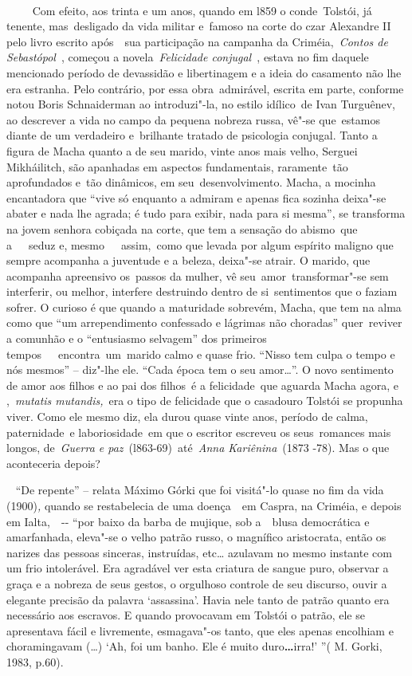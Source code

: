 ~

~~~~ Com efeito, aos trinta e um anos, quando em l859 o conde~Tolstói,
já tenente, mas~desligado da vida militar e~famoso na corte do czar
Alexandre II pelo livro escrito após~~sua participação na campanha da
Criméia,~\emph{Contos de Sebastópol}~, começou a novela~\emph{Felicidade
conjugal~}, estava no fim daquele mencionado período de devassidão e
libertinagem e a ideia do casamento não lhe era estranha. Pelo
contrário, por essa obra~admirável, escrita em parte, conforme notou
Boris Schnaiderman ao introduzi"-la, no estilo idílico~de Ivan Turguênev,
ao descrever a vida no campo da pequena nobreza russa, vê"-se que~estamos
diante de um verdadeiro e~brilhante tratado de psicologia conjugal.
Tanto a figura de Macha quanto a de seu marido, vinte anos mais velho,
Serguei Mikháilitch, são apanhadas em aspectos fundamentais,
raramente~tão aprofundados e~tão dinâmicos, em seu~desenvolvimento.
Macha, a mocinha encantadora que ``vive só enquanto a admiram e apenas
fica sozinha deixa"-se abater e nada lhe agrada; é tudo para exibir, nada
para si mesma'', se transforma na jovem senhora cobiçada na corte, que
tem a sensação do abismo~que a~~~seduz e, mesmo~~~assim,~como que levada
por algum espírito maligno que sempre acompanha a juventude e a beleza,
deixa"-se atrair. O marido, que acompanha apreensivo os~passos da mulher,
vê seu~amor~transformar"-se sem interferir, ou melhor, interfere
destruindo dentro de si~sentimentos que o faziam sofrer. O curioso é que
quando a maturidade sobrevém, Macha, que tem na alma como que ``um
arrependimento confessado e lágrimas não choradas'' quer~reviver a
comunhão e o ``entusiasmo selvagem'' dos primeiros
tempos~~~encontra~um~marido calmo e quase frio. ``Nisso tem culpa o
tempo e nós mesmos'' -- diz"-lhe ele. ``Cada época tem o seu amor\ldots{}''. O
novo sentimento de amor aos filhos e ao pai dos filhos~é a
felicidade~que aguarda Macha agora, e ,~\emph{mutatis mutandis,}~era o
tipo de felicidade que o casadouro Tolstói se propunha viver. Como ele
mesmo diz, ela durou quase vinte anos, período de calma, paternidade~e
laboriosidade~em que o escritor escreveu os seus~romances mais longos,
de~\emph{Guerra e paz}~(l863-69)~até~\emph{Anna Kariênina}~(1873 -78).
Mas o que aconteceria depois?

~ ``De repente'' -- relata Máximo Górki que foi visitá"-lo quase no fim
da vida (1900)\emph{,} quando se restabelecia de uma doença~~em Caspra,
na Criméia, e depois em Ialta,~\emph{~}-\/- ``por baixo da barba de
mujique, sob a~~blusa democrática e amarfanhada, eleva"-se o velho patrão
russo, o magnífico aristocrata, então os narizes das pessoas sinceras,
instruídas, etc\ldots{} azulavam no mesmo instante com um frio intolerável.
Era agradável ver esta criatura de sangue puro, observar a graça e a
nobreza de seus gestos, o orgulhoso controle de seu discurso, ouvir a
elegante precisão da palavra `assassina'. Havia nele tanto de patrão
quanto era necessário aos escravos. E quando provocavam em Tolstói o
patrão, ele se apresentava fácil e livremente, esmagava"-os tanto, que
eles apenas encolhiam e choramingavam (\ldots{}) `Ah, foi um banho. Ele é
muito duro\textbf{\ldots{}}irra!' ''( M. Gorki, 1983, p.60).

